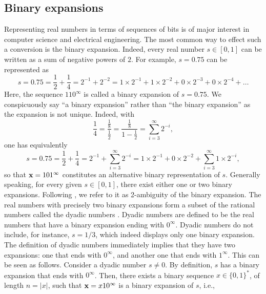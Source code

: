 

\subsection{Binary expansions}
\label{sec:binary expansion}
  
Representing real numbers in terms of sequences of bits is of major interest in computer science and electrical engineering. The most common way to effect such a conversion is the binary expansion. Indeed, every real number $s \in [0,1]$ can be written as a sum of negative powers of $2$. For example, $s = 0.75$ can be represented as
  \begin{equation}\label{eq:greedy binary expansion example}
      s = 0.75 =  \frac{1}{2} + \frac{1}{4} = 2^{-1} + 2^{-2} = 1 \times 2^{-1} + 1 \times 2^{-2} + 0 \times 2^{-3} + 0 \times 2^{-4} + \ldots
  \end{equation}
Here, the sequence $110^\infty$ is called a binary expansion of $s=0.75$. We conspicuously say ``a binary expansion'' rather than ``the binary expansion'' as the expansion is not unique. Indeed, with 
  \begin{equation}
      \frac{1}{4} = \frac{\frac{1}{8}}{\frac{1}{2}} = \frac{\frac{1}{8}}{1 - \frac{1}{2}} = \sum_{i=3}^\infty 2^{-i},
  \end{equation}
  one has equivalently
  \begin{equation}\label{eq:lazy binary expansion example}
      s = 0.75 = \frac{1}{2} + \frac{1}{4} = 2^{-1} + \sum_{i=3}^\infty 2^{-i} = 1\times 2^{-1} +  0\times 2^{-2} + \sum_{i=3}^\infty 1\times 2^{-i},
  \end{equation}
  so that ${\bf x} = 101^\infty$ constitutes an alternative binary representation of $s$. Generally speaking, for every given $s \in [0,1]$, there exist either one or two binary expansions. Following
  \cite[Section 1]{staiger2002kolmogorov}, we refer to it as 2-ambiguity of the binary expansion. The real numbers with precisely two binary expansions form a subset of the rational numbers called the dyadic numbers \cite[Section 1.5, Problem 44]{royden1968real}. Dyadic numbers are defined to be the real numbers that have a binary expansion ending with $0^\infty$. Dyadic numbers do not include, for instance, $s = 1/3$, which indeed displays only one binary expansion. The definition of dyadic numbers immediately implies that they have two expansions: one that ends with $0^\infty$, and another one that ends with $1^\infty$. This can be seen as follows. Consider a dyadic number $s \neq 0$. By definition, $s$ has a binary expansion that ends with $0^\infty$. Then, there exists a binary sequence $x \in \{0,1\}^\ast$, of length $n = |x|$, such that ${\bf x} = x 1 0^\infty$ is a binary expansion of $s$, i.e.,
